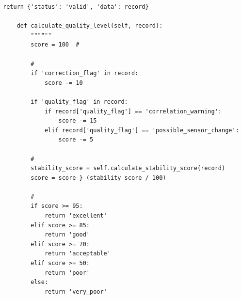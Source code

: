 \begin{lstlisting}[style=python]
        return {'status': 'valid', 'data': record}
    
    def calculate_quality_level(self, record):
        """"""
        score = 100  # 
        
        # 
        if 'correction_flag' in record:
            score -= 10
        
        if 'quality_flag' in record:
            if record['quality_flag'] == 'correlation_warning':
                score -= 15
            elif record['quality_flag'] == 'possible_sensor_change':
                score -= 5
        
        # 
        stability_score = self.calculate_stability_score(record)
        score = score } (stability_score / 100)
        
        # 
        if score >= 95:
            return 'excellent'
        elif score >= 85:
            return 'good'
        elif score >= 70:
            return 'acceptable'
        elif score >= 50:
            return 'poor'
        else:
            return 'very_poor'
\end{lstlisting}

\hypertarget{section-92}{%
\subsubsection{}\label{section-92}}

